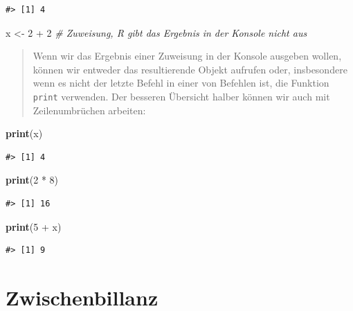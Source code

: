 \documentclass[]{tufte-book}
\newenvironment{Shaded}{}{}
\newcommand{\KeywordTok}[1]{\textcolor[rgb]{0.00,0.44,0.13}{\textbf{#1}}}
\newcommand{\DecValTok}[1]{\textcolor[rgb]{0.25,0.63,0.44}{#1}}
\newcommand{\StringTok}[1]{\textcolor[rgb]{0.25,0.44,0.63}{#1}}
\newcommand{\CommentTok}[1]{\textcolor[rgb]{0.38,0.63,0.69}{\textit{#1}}}
\newcommand{\OperatorTok}[1]{\textcolor[rgb]{0.40,0.40,0.40}{#1}}
\newcommand{\NormalTok}[1]{#1}
\begin{document}
\begin{verbatim}
#> [1] 4
\end{verbatim}

\begin{Shaded}
\begin{Highlighting}[]
\NormalTok{x <-}\StringTok{ }\DecValTok{2} \OperatorTok{+}\StringTok{ }\DecValTok{2}  \CommentTok{# Zuweisung, R gibt das Ergebnis in der Konsole nicht aus}
\end{Highlighting}
\end{Shaded}

\begin{quote}
Wenn wir das Ergebnis einer Zuweisung in der Konsole ausgeben wollen,
können wir entweder das resultierende Objekt aufrufen oder, insbesondere
wenn es nicht der letzte Befehl in einer von Befehlen ist, die Funktion
\texttt{print} verwenden. Der besseren Übersicht halber können wir auch
mit Zeilenumbrüchen arbeiten:
\end{quote}

\begin{Shaded}
\begin{Highlighting}[]
\KeywordTok{print}\NormalTok{(x)}
\end{Highlighting}
\end{Shaded}

\begin{verbatim}
#> [1] 4
\end{verbatim}

\begin{Shaded}
\begin{Highlighting}[]
\KeywordTok{print}\NormalTok{(}\DecValTok{2} \OperatorTok{*}\StringTok{ }\DecValTok{8}\NormalTok{)}
\end{Highlighting}
\end{Shaded}

\begin{verbatim}
#> [1] 16
\end{verbatim}

\begin{Shaded}
\begin{Highlighting}[]
\KeywordTok{print}\NormalTok{(}\DecValTok{5} \OperatorTok{+}\StringTok{ }\NormalTok{x)}
\end{Highlighting}
\end{Shaded}

\begin{verbatim}
#> [1] 9
\end{verbatim}

\section{Zwischenbillanz}\label{zwischenbillanz}
\end{document}
